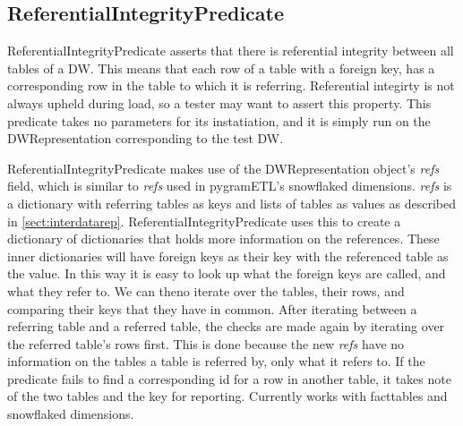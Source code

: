 \subsection{ReferentialIntegrityPredicate}
ReferentialIntegrityPredicate asserts that there is referential integrity between all tables of  a DW. This means that each row of a table with a foreign key, has a corresponding row in the table to which it is referring. Referential integirty is not always upheld during load, so a tester may want to assert this property. This predicate takes no parameters for its instatiation, and it is simply run on the DWRepresentation corresponding to the test DW.


ReferentialIntegrityPredicate makes use of the DWRepresentation object's \emph{refs} field, which is similar to \emph{refs} used in pygramETL's snowflaked dimensions. \emph{refs} is a dictionary with referring tables as keys and lists of tables as values as described in \cref{sect:interdatarep}. ReferentialIntegrityPredicate uses this to create a dictionary of dictionaries that holds more information on the references. These inner dictionaries will have foreign keys as their key with the referenced table as the value. In this way it is easy to look up what the foreign keys are called, and what they refer to. We can theno iterate over the tables, their rows, and comparing their keys that they have in common. After iterating between a referring table and a referred table, the checks are made again by iterating over the referred table's rows first. This is done because the new \emph{refs} have no information on the tables a table is referred by, only what it refers to. If the predicate fails to find a corresponding id for a row in another table, it takes note of the two tables and the key for reporting. Currently works with facttables and snowflaked dimensions.
